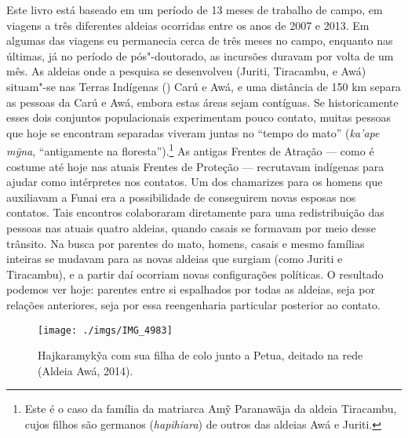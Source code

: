 Este livro está baseado em um período de 13 meses de trabalho de campo,
em viagens a três diferentes aldeias ocorridas entre os anos de 2007 e
2013. Em algumas das viagens eu permanecia cerca de três meses no campo,
enquanto nas últimas, já no período de pós"-doutorado, as incursões
duravam por volta de um mês. As aldeias onde a pesquisa se desenvolveu
(Juriti, Tiracambu, e Awá)
 situam"-se nas Terras Indígenas () Carú e Awá, e uma
distância de 150 km separa as pessoas da  Carú e Awá, embora estas áreas
sejam contíguas. Se historicamente esses dois conjuntos
populacionais experimentam pouco contato, muitas pessoas que hoje se
encontram separadas viveram juntas no ``tempo do mato'' (\emph{ka'ape
mỹna}, ``antigamente na floresta'').\footnote{Este é o caso da família da
  matriarca Amỹ Paranawãja da aldeia Tiracambu, cujos filhos são
  germanos (\emph{hapihiara}) de outros das aldeias Awá e Juriti.} As
antigas Frentes de Atração --- como é costume até hoje nas atuais Frentes
de Proteção --- recrutavam indígenas para ajudar como intérpretes nos
contatos. Um dos chamarizes para os homens que auxiliavam a Funai era a
possibilidade de conseguirem novas esposas nos contatos. Tais encontros
colaboraram diretamente para uma redistribuição das pessoas nas atuais
quatro aldeias, quando casais se formavam por meio desse trânsito. Na
busca por parentes do mato, homens, casais e mesmo famílias inteiras se
mudavam para as novas aldeias que surgiam (como Juriti e Tiracambu), e a
partir daí ocorriam novas configurações políticas. O resultado podemos
ver hoje: parentes entre si espalhados por todas as aldeias, seja por
relações anteriores, seja por essa reengenharia particular posterior ao
contato.

\begin{figure}[H]
\centering
  \texttt{[image: ./imgs/IMG\_4983]}
\caption{Hajkaramykỹa com sua filha de colo junto a Petua, deitado na rede (Aldeia Awá, 2014).}
\end{figure}

